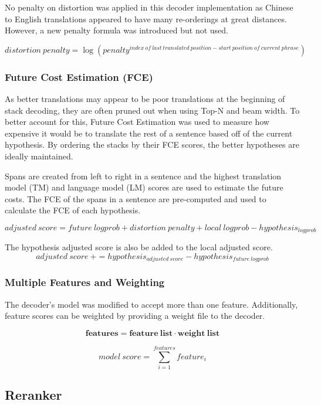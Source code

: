 \documentclass[letterpaper]{article}
\begin{document}
\indent \indent No penalty on distortion was applied in this decoder implementation as Chinese to English translations appeared to have many re-orderings at great distances. However, a new penalty formula was introduced but not used.

\[distortion\:penalty = \log(penalty^{index\:of\:last\:translated\:position - start\:position\:of\:current\:phrase})\]

\subsubsection{Future Cost Estimation (FCE)}

\indent \indent As better translations may appear to be poor translations at the beginning of stack decoding, they are often pruned out when using Top-N and beam width. To better account for this, Future Cost Estimation was used to measure how expensive it would be to translate the rest of a sentence based off of the current hypothesis. By ordering the stacks by their FCE scores, the better hypotheses are ideally maintained.
\newline

Spans are created from left to right in a sentence and the highest translation model (TM) and language model (LM) scores are used to estimate the future costs. The FCE of the spans in a sentence are pre-computed and used to calculate the FCE of each hypothesis.

\[adjusted\:score = future\:logprob + distortion\:penalty + local\:logprob - hypothesis_{logprob}\]

The hypothesis adjusted score is also be added to the local adjusted score.
\[adjusted\:score\:+= hypothesis_{adjusted\:score} - hypothesis_{future\:logprob}\]

\subsubsection{Multiple Features and Weighting}

\indent \indent The decoder's model was modified to accept more than one feature. Additionally, feature scores can be weighted by providing a weight file to the decoder.

\[\mathbf{features} = \mathbf{feature\:list} \cdot \mathbf{weight\:list}\]

\[model\:score = \sum\limits_{i=1}^{features} feature_i\]

\subsection{Reranker}
\end{document}
